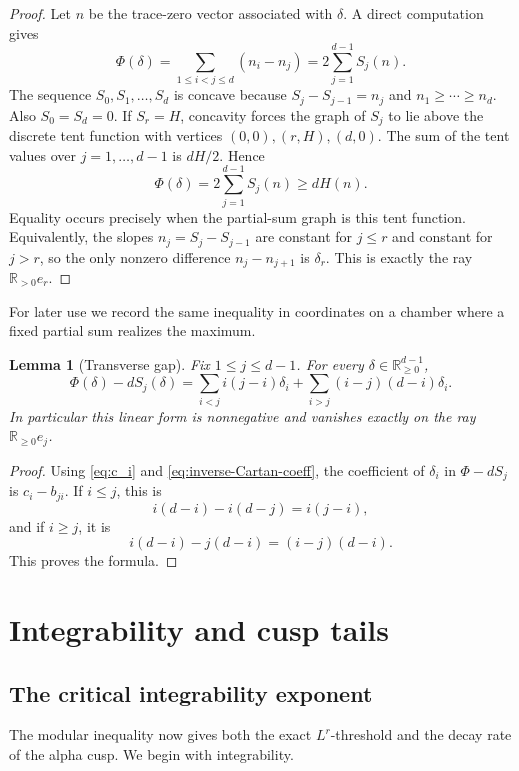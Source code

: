 \documentclass[11pt]{amsart}
\newcommand{\RR}{\mathbb R}
\theoremstyle{plain}
\newtheorem{lemma}[theorem]{Lemma}
\theoremstyle{definition}
\numberwithin{equation}{section}
\begin{document}
\begin{proof}
Let $n$ be the trace-zero vector associated with $\delta$.  A direct computation gives
\[
  \Phi(\delta)=\sum_{1\le i<j\le d}(n_i-n_j)=2\sum_{j=1}^{d-1}S_j(n).
\]
The sequence $S_0,S_1,\ldots,S_d$ is concave because
$S_j-S_{j-1}=n_j$ and $n_1\ge\cdots\ge n_d$.  Also $S_0=S_d=0$.  If $S_r=H$, concavity
forces the graph of $S_j$ to lie above the discrete tent function with vertices
$(0,0),(r,H),(d,0)$.  The sum of the tent values over $j=1,\ldots,d-1$ is $dH/2$.  Hence
\[
  \Phi(\delta)=2\sum_{j=1}^{d-1}S_j(n)\ge dH(n).
\]
Equality occurs precisely when the partial-sum graph is this tent function.  Equivalently,
the slopes $n_j=S_j-S_{j-1}$ are constant for $j\le r$ and constant for $j>r$, so the only
nonzero difference $n_j-n_{j+1}$ is $\delta_r$.  This is exactly the ray $\RR_{>0}e_r$.
\end{proof}

For later use we record the same inequality in coordinates on a chamber where a fixed
partial sum realizes the maximum.

\begin{lemma}[Transverse gap]\label{lem:transverse-gap}
Fix $1\le j\le d-1$.  For every $\delta\in\RR_{\ge0}^{d-1}$,
\begin{equation}\label{eq:Rj-formula}
  \Phi(\delta)-dS_j(\delta)
  =
  \sum_{i<j}i(j-i)\delta_i+
  \sum_{i>j}(i-j)(d-i)\delta_i.
\end{equation}
In particular this linear form is nonnegative and vanishes exactly on the ray
$\RR_{\ge0}e_j$.
\end{lemma}

\begin{proof}
Using \eqref{eq:c_i} and \eqref{eq:inverse-Cartan-coeff}, the coefficient of $\delta_i$ in
$\Phi-dS_j$ is $c_i-b_{ji}$.  If $i\le j$, this is
\[
  i(d-i)-i(d-j)=i(j-i),
\]
and if $i\ge j$, it is
\[
  i(d-i)-j(d-i)=(i-j)(d-i).
\]
This proves the formula.
\end{proof}

\section{Integrability and cusp tails}

\subsection{The critical integrability exponent}

The modular inequality now gives both the exact \(L^r\)-threshold and the decay
rate of the alpha cusp.  We begin with integrability.
\end{document}
